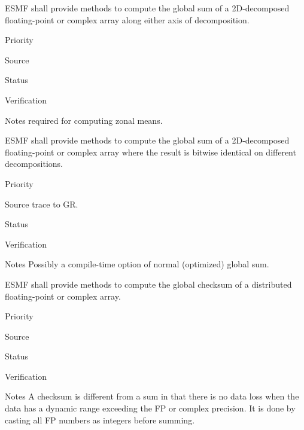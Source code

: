 
ESMF shall provide methods to compute the global sum of a 2D-decomposed
floating-point or complex array along either axis of decomposition.

\begin{reqlist}
\item[Priority]
\item[Source]
\item[Status]
\item[Verification]
\item[Notes] required for computing zonal means.
\end{reqlist}


ESMF shall provide methods to compute the global sum of a
2D-decomposed floating-point or complex array where the result is
bitwise identical on different decompositions.

\begin{reqlist}
\item[Priority]
\item[Source] trace to GR.
\item[Status]
\item[Verification]
\item[Notes] Possibly a compile-time option of normal (optimized)
             global sum.
\end{reqlist}


ESMF shall provide methods to compute the global checksum of a
distributed floating-point or complex array. 

\begin{reqlist}
\item[Priority]
\item[Source]
\item[Status]
\item[Verification]
\item[Notes] A checksum is different from a sum in that there is no
  data loss when the data has a dynamic range exceeding the FP or
  complex precision. It is done by casting all FP numbers as integers
  before summing.
\end{reqlist}

%
%


